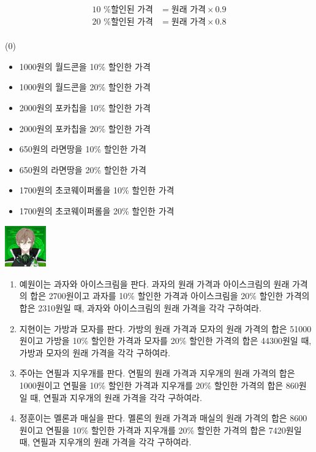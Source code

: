 \documentclass{article}
\begin{document}
\newpage
\section{}

\begin{align*}
\text{10 \% 할인된 가격} &= \text{원래 가격}\times0.9\\
\text{20 \% 할인된 가격} &= \text{원래 가격}\times0.8\\
\end{align*}

\begin{minipage}{0.5\textwidth}
\noindent (0)
\begin{itemize}
\item 1000원의 월드콘을 10\% 할인한 가격
\item 1000원의 월드콘을 20\% 할인한 가격
\item 2000원의 포카칩을 10\% 할인한 가격
\item 2000원의 포카칩을 20\% 할인한 가격
\item 650원의 라면땅을 10\% 할인한 가격
\item 650원의 라면땅을 20\% 할인한 가격
\item 1700원의 초코웨이퍼롤을 10\% 할인한 가격
\item 1700원의 초코웨이퍼롤을 20\% 할인한 가격
\end{itemize}
\vspace{80pt}
\end{minipage}
\begin{minipage}{0.4\textwidth}
    \raggedleft
    \includegraphics[width=50pt]{onyu.png}
\end{minipage}

\begin{multicols}{2}
\begin{enumerate}[label=(\arabic*), itemsep=80pt]
    \item
    예원이는 과자와 아이스크림을 판다.
    과자의 원래 가격과 아이스크림의 원래 가격의 합은 2700원이고
    과자를 10\% 할인한 가격과 아이스크림을 20\% 할인한 가격의 합은 2310원일 때, 과자와 아이스크림의 원래 가격을 각각 구하여라.
    \item
    지현이는 가방과 모자를 판다.
    가방의 원래 가격과 모자의 원래 가격의 합은 51000원이고
    가방을 10\% 할인한 가격과 모자를 20\% 할인한 가격의 합은 44300원일 때, 가방과 모자의 원래 가격을 각각 구하여라.
    \item
    주아는 연필과 지우개를 판다.
    연필의 원래 가격과 지우개의 원래 가격의 합은 1000원이고
    연필을 10\% 할인한 가격과 지우개를 20\% 할인한 가격의 합은 860원일 때, 연필과 지우개의 원래 가격을 각각 구하여라.
    \item
    정훈이는 멜론과 매실을 판다.
    멜론의 원래 가격과 매실의 원래 가격의 합은 8600원이고
    연필을 10\% 할인한 가격과 지우개를 20\% 할인한 가격의 합은 7420원일 때, 연필과 지우개의 원래 가격을 각각 구하여라.
\end{enumerate}
\end{multicols}
\end{document}
